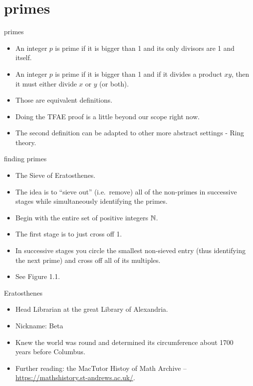 \documentclass[landscape]{beamer}
\begin{document}
\section{primes}

\begin{frame}{primes}
\begin{itemize}
\item An integer $p$ is prime if it is bigger than 1 and its only divisors are 1 and itself. \pause
\item An integer $p$ is prime if it is bigger than 1 and if it divides a product $xy$, then it must either divide $x$ or $y$ (or both). \pause
\item Those are equivalent definitions.\pause
\item Doing the TFAE proof is a little beyond our scope right now.\pause 
\item The second definition can be adapted to other more abstract settings - Ring theory.
\end{itemize}
\end{frame}

\begin{frame}{finding primes}
\begin{itemize}
\item The Sieve of Eratosthenes. \pause
\item The idea is to ``sieve out'' (i.e.\ remove) all of the non-primes in successive stages while simultaneously identifying the primes. \pause
\item Begin with the entire set of positive integers ${\mathbb N}$. \pause
\item The first stage is to just cross off 1. \pause
\item In successive stages you circle the smallest non-sieved entry (thus identifying the next prime) and cross off all of its multiples. \pause
\item See Figure 1.1.
\end{itemize}
\end{frame}

\begin{frame}{Eratosthenes}
\begin{itemize}
\item Head Librarian at the great Library of Alexandria. \pause
\item Nickname: Beta \pause
\item Knew the world was round and determined its circumference about 1700 years before Columbus. \pause
\item Further reading: the MacTutor Histoy of Math Archive -- \href{https://mathshistory.st-andrews.ac.uk/}{https://mathshistory.st-andrews.ac.uk/}.
\end{itemize}
\end{frame}
\end{document}
